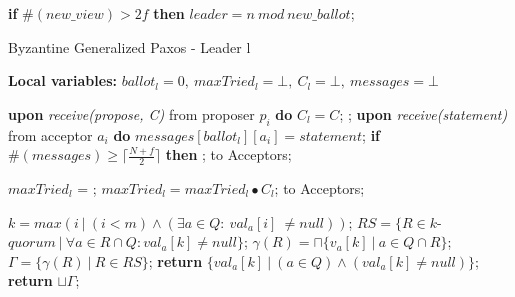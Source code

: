 \begin{algorithm}
\begin{algorithmic}[1]
		\State\hspace{\algorithmicindent} \textbf{if} $\#(new\_view) > 2f$ \textbf{then}
		\State\hspace{\algorithmicindent}\hspace{\algorithmicindent} $leader = n\ mod\ new\_ballot$;
	\end{algorithmic}
\end{algorithm}

\begin{algorithm}
	\caption{Byzantine Generalized Paxos - Leader l}
	\textbf{Local variables:} $ballot_l = 0,\ maxTried_l = \bot,\ C_l = \bot,\ messages = \bot$
	\begin{algorithmic}[1]
		\State \textbf{upon} \textit{receive(propose, C)} from proposer $p_i$ \textbf{do} 
		\State \hspace{\algorithmicindent} $C_l = C$;
		\State \hspace{\algorithmicindent} ;
		\State
		\State \textbf{upon} \textit{receive(statement)} from acceptor $a_i$ \textbf{do}
		\State \hspace{\algorithmicindent}  $messages[ballot_l][a_i] = statement$;
		\State \hspace{\algorithmicindent} \textbf{if} $\#(messages) \geq \lceil \frac{N+f}{2}\rceil$ \textbf{then} 
		\State \hspace{\algorithmicindent}\hspace{\algorithmicindent} ;
		\State
		\State {} to Acceptors;
		\EndFunction
		
		\State
		\State $maxTried_l$ = ;
		\State $maxTried_l = maxTried_l \bullet C_l$;
		\State {} to Acceptors;
		\EndFunction
		
		\State
		\State $k = max(i\ |\ (i < m) \wedge (\exists a \in Q :\ val_a[i]\ \neq null))$;
		\State $RS = \{R \in k$-$quorum\ |\ \forall a \in R \cap Q : val_a[k] \neq null\}$;
		\State $\gamma(R) = \sqcap \{v_a[k]\ |\ a \in Q \cap R \}$;
		\State $\Gamma = \{\gamma(R)\ |\ R \in RS \}$;
		\State
		\State \textbf{return} $\{val_a[k]\ |\ (a \in Q) \wedge (val_a[k] \neq null)\}$;
		\Else
		\State \textbf{return} $\sqcup \Gamma$;
		\EndIf
		\EndFunction
		
	\end{algorithmic}
\end{algorithm}

